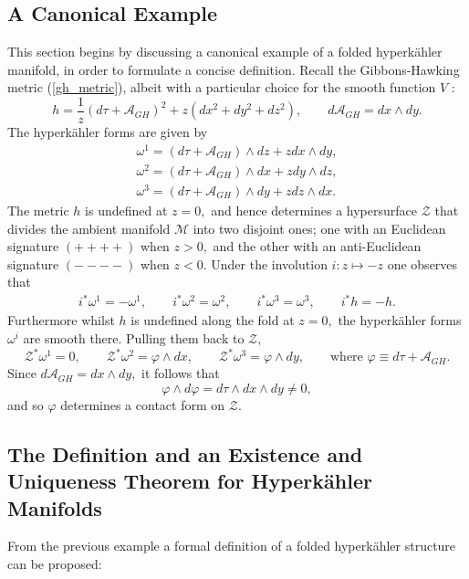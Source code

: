\documentclass[a4paper,12pt, onecolumn, notitlepage]{article}
\theoremstyle{definition}
\theoremstyle{remark}
\newcommand{\w}{\omega}
\newcommand{\HK}{hyperk\"ahler }
\newcommand{\vp}{\varphi}
\begin{document}
\subsection{A Canonical Example}
This section begins by discussing a canonical example of a folded \HK manifold, in order to formulate a concise definition. Recall the Gibbons-Hawking metric (\ref{gh_metric}), albeit with a particular choice for the smooth function $V$ \cite{hitchin_2015}:
\begin{equation*}
	h = \frac{1}{z}(d\tau + \mathcal{A}_{GH})^{2} + z(dx^{2} + dy^{2} + dz^{2}), \qquad d\mathcal{A}_{GH} = dx\wedge dy.
\end{equation*} 
The \HK forms are given by
\begin{align*}
	\w^{1} = (d\tau+\mathcal{A}_{GH})\wedge dz + z dx\wedge dy,\\
	\w^{2} = (d\tau+\mathcal{A}_{GH})\wedge dx + z dy\wedge dz,\\
	\w^{3} = (d\tau+\mathcal{A}_{GH})\wedge dy + z dz\wedge dx.
\end{align*}
The metric $h$ is undefined at $z=0,$ and hence determines a hypersurface $\mathcal{Z}$ that divides the ambient manifold $\mathcal{M}$ into two disjoint ones; one with an Euclidean signature $(++++)$ when $z>0,$ and the other with an anti-Euclidean signature $(----)$ when $z<0.$ Under the involution $i:z\mapsto-z$ one observes that
\begin{gather*}
	i^{\ast}\w^{1} = -\w^{1},\qquad
	i^{\ast}\w^{2} = \w^{2},\qquad
	i^{\ast}\w^{3} = \w^{3},\qquad
	i^{\ast}h = -h.
\end{gather*}
Furthermore whilst $h$ is undefined along the fold at $z=0,$ the \HK forms $\w^{i}$ are smooth there. Pulling them back to $\mathcal{Z},$
\begin{equation}
	\label{pullback_GH}
	\mathcal{Z}^{\ast}\w^{1} = 0,\qquad \mathcal{Z}^{\ast}\w^{2} = \vp\wedge dx,\qquad \mathcal{Z}^{\ast}\w^{3} = \vp\wedge dy,\qquad \text{where } \vp\equiv d\tau + \mathcal{A}_{GH}.
\end{equation}
Since $d\mathcal{A}_{GH} = dx\wedge dy,$ it follows that
\begin{equation*}
	\vp\wedge d\vp = d\tau\wedge dx \wedge dy \neq 0,
\end{equation*}
and so $\vp$ determines a contact form on  $\mathcal{Z}.$
	
\subsection{The Definition and an Existence and Uniqueness Theorem for Hyperk\"ahler Manifolds}
From the previous example a formal definition of a folded \HK structure can be proposed:\\
\end{document}
